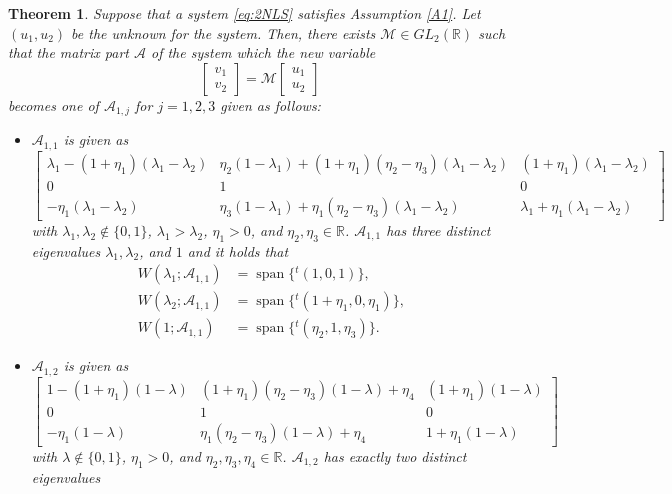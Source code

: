 \documentclass[11pt,a4paper,twosides]{amsart}
\theoremstyle{plain}
\newtheorem{theorem}{Theorem}[section]
\theoremstyle{remark}
\numberwithin{equation}{section}
\newcommand{\R}{\mathbb{R}}
\DeclareMathOperator{\Span}{span}
\theoremstyle{definition}
\newcommand{\1}{{\bf 1}_{\{|x| < |t|\}}}
\begin{document}
\begin{theorem}\label{thm:standard1}
Suppose that a system \eqref{eq:2NLS} satisfies Assumption \ref{A1}. Let $(u_1,u_2)$ be the unknown for the system.
Then, there exists $\mathscr{M} \in GL_2(\R)$ such that the matrix part $\mathscr{A}$ 
of the system which the new variable
\[
	\begin{bmatrix}
	v_1 \\ v_2
	\end{bmatrix}
	= \mathscr{M}
	\begin{bmatrix}
	u_1 \\ u_2
	\end{bmatrix}
\]
becomes one of $\mathscr{A}_{1,j}$ for $j=1,2,3$ given as follows:
\begin{itemize}
\item $\mathscr{A}_{1,1}$ is given as
\[
\begin{bmatrix}
	\lambda_1 - (1+\eta_1)(\lambda_1-\lambda_2) & 
	\eta_2(1-\lambda_1) +(1+\eta_1)(\eta_2-\eta_3)(\lambda_1-\lambda_2) 
	& (1+\eta_1)(\lambda_1-\lambda_2) \\
	0 & 1& 0\\
	-\eta_1(\lambda_1-\lambda_2) & \eta_3(1- \lambda_1) +\eta_1(\eta_2-\eta_3)(\lambda_1-\lambda_2)& \lambda_1 +\eta_1(\lambda_ 1- \lambda_2)
	\end{bmatrix}
\]
with $\lambda_1,\lambda_2 \not\in \{0,1\}$, $\lambda_1>\lambda_2$,
$\eta_1>0$, and $\eta_2,\eta_3\in \R$.
$\mathscr{A}_{1,1}$ has three distinct eigenvalues 
$\lambda_1,\lambda_2$, and $1$ and it holds that
\begin{align*}
	W(\lambda_1;\mathscr{A}_{1,1}) 
	&= \Span \{{}^t\!(1,0,1) \}, \\
	W(\lambda_2;\mathscr{A}_{1,1}) 
	&= \Span \{{}^t\!(1+\eta_1,0,\eta_1) \},\\
	W(1;\mathscr{A}_{1,1}) 
	&= \Span \{{}^t\!(\eta_2,1,\eta_3) \}.
\end{align*}
\item $\mathscr{A}_{1,2}$ is given as
\[
	\begin{bmatrix}
	1 - (1+\eta_1)(1-\lambda) & 
	 (1+ \eta_1)(\eta_2 - \eta_3)(1-\lambda) + \eta_4
	& (1+\eta_1)(1-\lambda) \\
	0 & 1 & 0\\
	-\eta_1(1-\lambda) & \eta_1(\eta_2- \eta_3)(1-\lambda)+\eta_4 & 1+\eta_1(1-\lambda)
	\end{bmatrix}
\]
with $\lambda \not\in \{0,1\}$, $\eta_1>0$, and $\eta_2,\eta_3,\eta_4\in \R$.
$\mathscr{A}_{1,2}$ has exactly two distinct eigenvalues

\end{itemize}
\end{theorem}
\end{document}
